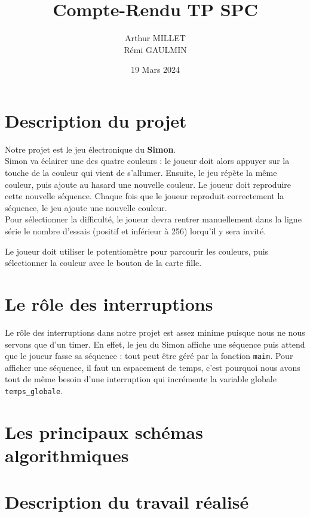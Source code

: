 \documentclass[10pt,a4,french]{article}
\title{Compte-Rendu TP SPC}
\author{Arthur MILLET\\ Rémi GAULMIN}
\date{19 Mars 2024}
\begin{document}
\lstset{language=C, frame=single}

\maketitle

\section{Description du projet}

Notre projet est le jeu électronique du \textbf{Simon}.
\\

Simon va éclairer une des quatre couleurs :
le joueur doit alors appuyer sur la touche de la couleur qui vient de s'allumer.
Ensuite, le jeu répète la même couleur, puis ajoute au hasard une nouvelle couleur.
Le joueur doit reproduire cette nouvelle séquence.
Chaque fois que le joueur reproduit correctement la séquence, le jeu ajoute une nouvelle couleur.
\\

Pour sélectionner la difficulté, le joueur devra rentrer manuellement dans la ligne série le nombre d'essais (positif et inférieur à 256) lorqu'il y sera invité.

Le joueur doit utiliser le potentiomètre pour parcourir les couleurs,
puis sélectionner la couleur avec le bouton de la carte fille.

\section{Le rôle des interruptions}

Le rôle des interruptions dans notre projet est assez minime puisque nous ne nous servons que d'un timer.
En effet, le jeu du Simon affiche une séquence puis attend que le joueur fasse sa séquence : tout peut être géré par la fonction \texttt{main}.
Pour afficher une séquence, il faut un espacement de temps,
c'est pourquoi nous avons tout de même besoin d'une interruption qui incrémente la variable globale \texttt{temps\_globale}.

\section{Les principaux schémas algorithmiques}

\section{Description du travail réalisé}
\end{document}
